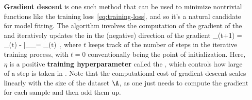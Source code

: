 \textbf{Gradient descent} is one such method that can be used to minimize nontrivial functions like the training loss~\eqref{eq:training-loss}, and so it's a natural candidate for model fitting. The algorithm involves the  computation of the gradient of the 
and iteratively updates the  in the (negative) direction of the gradient
\be\label{eq:gd-update}
\theta_\mu(t+1) = \theta_\mu(t) - \eta \frac{\td \L_\A}{\td \theta_\mu}\Bigg|_{\theta_\mu = \theta_\mu(t)} \,,
\ee
where  $t$ keeps track of the number of steps in the iterative training process, with $t=0$ conventionally being the point of initialization.
Here, $\eta$ is a positive \textbf{training hyperparameter} called the ,
which controls how large of a step is taken in . Note that the computational cost of gradient descent scales linearly with the size of the dataset $\A$, as one just needs to compute the gradient for each sample and then add them up. 


